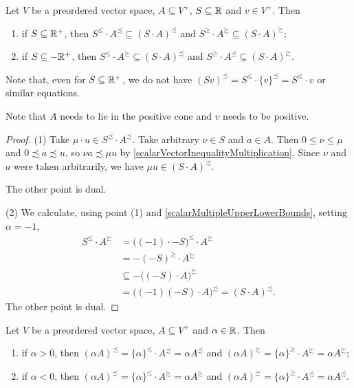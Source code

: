 \begin{lemma} \label{scalarMultipleSetsUpperLowerBounds}
Let $V$ be a preordered vector space, $A\subseteq V^+$, $S\subseteq \mathbb{R}$ and $v\in V^+$. Then
\begin{enumerate}
\item if $S \subseteq \mathbb{R}^+$, then $S^\leq \cdot A^\precsim \subseteq (S\cdot A)^\precsim$ and $S^\geq\cdot A^\succsim \subseteq (S\cdot A)^\succsim$;
\item if $S \subseteq -\mathbb{R}^+$, then $S^\leq \cdot A^\succsim \subseteq (S\cdot A)^\precsim$ and $S^\geq \cdot A^\precsim \subseteq (S\cdot A)^\succsim$.
\end{enumerate}
Note that, even for $S\subseteq \mathbb{R}^+$, we do not have $(Sv)^\precsim = S^\leq\cdot \{v\}^\precsim = S^\leq \cdot v$ or similar equations.
\end{lemma}
Note that $A$ needs to lie in the positive cone and $v$ needs to be positive.
\begin{proof}
(1) Take $\mu \cdot u \in S^\precsim \cdot A^\precsim$. Take arbitrary $\nu\in S$ and $a\in A$. Then $0\leq \nu \leq \mu$ and $0 \precsim a\precsim u$, so $\nu a \precsim \mu u$ by \ref{scalarVectorInequalityMultiplication}. Since $\nu$ and $a$ were taken arbitrarily, we have $\mu u \in (S\cdot A)^\precsim$.

The other point is dual.

(2) We calculate, using point (1) and \ref{scalarMultipleUpperLowerBounds}, setting $\alpha = -1$,
\begin{align*}
S^\leq \cdot A^\succsim &= \big((-1)\cdot -S\big)^\leq \cdot A^\succsim \\
&= -(-S)^\geq \cdot A^\succsim \\
&\subseteq - \big((-S)\cdot A\big)^\succsim \\
&= \big((-1)(-S)\cdot A\big)^\precsim = (S\cdot A)^\precsim.
\end{align*}
The other point is dual.
\end{proof}
\begin{corollary}
Let $V$ be a preordered vector space, $A\subseteq V^+$ and $\alpha\in \mathbb{R}$. Then
\begin{enumerate}
\item if $\alpha > 0$, then $(\alpha A)^\precsim = \{\alpha\}^\leq\cdot A^\precsim = \alpha A^\precsim$ and $(\alpha A)^\succsim = \{\alpha\}^\geq\cdot A^\succsim = \alpha A^\succsim$;
\item if $\alpha < 0$, then $(\alpha A)^\precsim = \{\alpha\}^\leq\cdot A^\succsim = \alpha A^\succsim$ and $(\alpha A)^\succsim = \{\alpha\}^\geq \cdot A^\precsim = \alpha A^\precsim$.
\end{enumerate}
\end{corollary}
